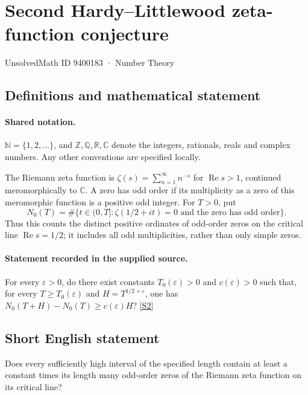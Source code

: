 \documentclass[11pt]{article}
\newcommand{\sref}[2]{\hyperlink{source:#1:#2}{[S#2]}}
\begin{document}
\setcounter{section}{9400182}
\section{Second Hardy–Littlewood zeta-function conjecture}\label{9400183}
{\small\sffamily UnsolvedMath ID 9400183 · Number Theory}
\subsection{Definitions and mathematical statement}

\paragraph{Shared notation.}$\mathbb N=\{1,2,\ldots\}$, and $\mathbb Z,\mathbb Q,\mathbb R,\mathbb C$ denote the integers, rationals, reals and complex numbers. Any other conventions are specified locally.


The Riemann zeta function is $\zeta(s)=\sum_{n=1}^{\infty}n^{-s}$ for $\operatorname{Re}s>1$, continued meromorphically to $\mathbb C$. A zero has odd order if its multiplicity as a zero of this meromorphic function is a positive odd integer. For $T>0$, put
\[N_0(T)=\#\{t\in(0,T]:\zeta(1/2+it)=0\text{ and the zero has odd order}\}.\]
Thus this counts the distinct positive ordinates of odd-order zeros on the critical line $\operatorname{Re}s=1/2$; it includes all odd multiplicities, rather than only simple zeros.
\paragraph{Statement recorded in the supplied source.}
For every $\varepsilon>0$, do there exist constants $T_0(\varepsilon)>0$ and $c(\varepsilon)>0$ such that, for every $T\ge T_0(\varepsilon)$ and $H=T^{1/2+\varepsilon}$, one has $N_0(T+H)-N_0(T)\ge c(\varepsilon)H$? \sref{9400183}{2}
\subsection{Short English statement}
Does every sufficiently high interval of the specified length contain at least a constant times its length many odd-order zeros of the Riemann zeta function on its critical line?
\end{document}
